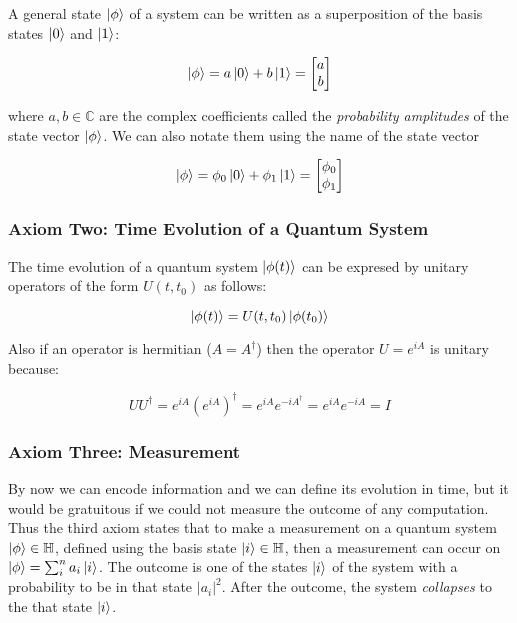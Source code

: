 A general state $\ket{\phi}$ of a system can be written as a superposition of the basis states $\ket{0}$ and $\ket{1}$:

\begin{equation}
    \ket{\phi} = a\ket{0} + b\ket{1} = \begin{bmatrix}
        a\\
        b
    \end{bmatrix}
\end{equation}

where $a,b\in\mathbb{C}$ are the complex coefficients called the \textit{probability amplitudes} of
the state vector $\ket{\phi}$. We can also notate them using the name of the state vector

\begin{equation}
    \ket{\phi} = \phi_0\ket{0} + \phi_1\ket{1} = \begin{bmatrix}
        \phi_0\\
        \phi_1
    \end{bmatrix}
\end{equation}

\subsubsection{Axiom Two: Time Evolution of a Quantum System}

The time evolution of a quantum system $\ket{\phi(t)}$ can be expresed by unitary operators
of the form $U(t, t_0)$ as follows:

\begin{equation}
    \ket{\phi(t)} = U(t, t_0)\ket{\phi(t_0)}
\end{equation}

Also if an operator is hermitian ($A=A^\dag$) then the operator $U=e^{iA}$ is unitary because:

\begin{equation}
    UU^\dag=e^{iA}(e^{iA})^\dag=e^{iA}e^{-iA^\dag}=e^{iA}e^{-iA}=I
\end{equation}

\subsubsection{Axiom Three: Measurement}

By now we can encode information and we can define its evolution in time, but it would be
gratuitous if we could not measure the outcome of any computation. Thus the third axiom states
that to make a measurement on a quantum system $\ket{\phi}\in\mathbb{H}$, defined using the
basis state $\ket{i}\in\mathbb{H}$, then a measurement can occur on $\ket{\phi}=\sum_{i}^{n}a_i\ket{i}$.
The outcome is one of the states $\ket{i}$ of the system with a probability to be in that state $|a_i|^2$.
After the outcome, the system \textit{collapses} to the that state $\ket{i}$.

